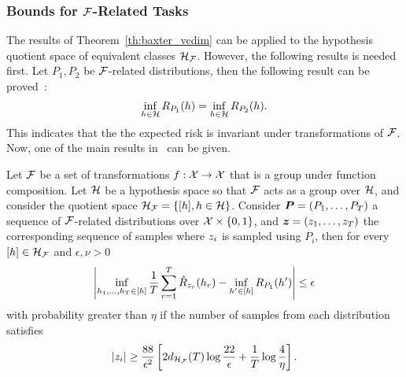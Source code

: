 \subsubsection*{Bounds for $\mathcal{F}$-Related Tasks}
The results of Theorem~\ref{th:baxter_vcdim} can be applied to the hypothesis quotient space of equivalent classes $\mathcal{H}_{\mathcal{F}}$. However, the following results is needed first.
%
Let $P_1, P_2$ be $\mathcal{F}$-related distributions, then the following result can be proved~\cite[Lemma~2]{Ben-DavidB08}:
\begin{equation}
    \label{eq:ben-david_lemma2}
    \inf_{\hypf \in \hypspace} \risk_{P_1}(\hypf) = \inf_{\hypf \in \hypspace} \risk_{P_2}(\hypf).
\end{equation}
This indicates that the the expected risk is invariant under transformations of $\mathcal{F}$.
Now, one of the main results in~\citet[Theorem~2]{baxter2000model} can be given.
\begin{theorem}\label{th:ben-david_th2}
    Let $\mathcal{F}$ be a set of transformations $f: \mathcal{X} \to \mathcal{X}$ that is a group under function composition. Let $\mathcal{H}$ be a hypothesis space so that $\mathcal{F}$ acts as a group over $\mathcal{H}$, and consider the quotient space $\mathcal{H}_{\mathcal{F}} = \left\{\lbrack h\rbrack, h \in \mathcal{H}\right\}$.
    Consider $\bm{P} = (P_1, \ldots, P_T)$ a sequence of $\mathcal{F}$-related distributions over $\mathcal{X} \times \left\{0, 1\right\}$, and $\bm{z} = (z_1, \ldots, z_T)$ the corresponding sequence of samples  where $z_i$ is sampled using $P_i$, then for every $\lbrack h\rbrack \in \mathcal{H}_{\mathcal{F}}$ and $\epsilon, \nu > 0$ 
    \begin{equation}
        \nonumber
        \left|\inf_{h_1, \ldots, h_T \in \lbrack h\rbrack} \frac{1}{T} \sum_{r=1}^T \hat{R}_{z_r}(h_r) - \inf_{h' \in \lbrack h\rbrack}R_{P_1}(h')\right|  \leq \epsilon
    \end{equation}
    with probability greater than $\eta$ if the number of samples from each distribution satisfies
    \begin{equation}
        \label{eq:ben-david_sample_inequality}
        \cardinal{\sample_i} \geq  \frac{88}{\epsilon^2} \left[2 d_{\hypspace_\frelset}(\ntasks) \log \frac{22}{\epsilon} + \frac{1}{\ntasks}\log\frac{4}{\eta} \right].
    \end{equation}
\end{theorem}
